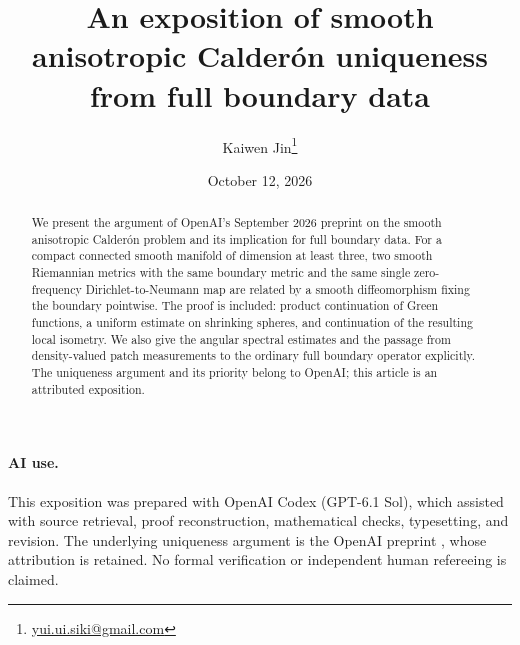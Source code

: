 \documentclass[11pt,a4paper]{article}
\title{An exposition of smooth anisotropic Calder\'on uniqueness\newline
from full boundary data}
\author{Kaiwen Jin\thanks{\href{mailto:yui.ui.siki@gmail.com}{yui.ui.siki@gmail.com}}}
\date{October 12, 2026}
\begin{document}
\maketitle
\begin{abstract}
We present the argument of OpenAI's September 2026 preprint on the smooth
anisotropic Calder\'on problem and its implication for full boundary data.
For a compact connected smooth manifold of dimension at least three,
two smooth Riemannian metrics with the same boundary metric and the same
single zero-frequency Dirichlet-to-Neumann map are related by a smooth
diffeomorphism fixing the boundary pointwise. The proof is included:
product continuation of Green functions, a uniform estimate on shrinking
spheres, and continuation of the resulting local isometry. We also give
the angular spectral estimates and the passage from density-valued patch
measurements to the ordinary full boundary operator explicitly. The
uniqueness argument and its priority belong to OpenAI; this article is
an attributed exposition.
\end{abstract}
{\footnotesize\tableofcontents}
\clearpage











\paragraph{AI use.}
This exposition was prepared with OpenAI Codex (GPT-6.1 Sol), which assisted
with source retrieval, proof reconstruction, mathematical checks,
typesetting, and revision. The underlying uniqueness argument is the
OpenAI preprint \citep{OpenAI2026}, whose attribution is retained.
No formal verification or independent human refereeing is claimed.


\end{document}
